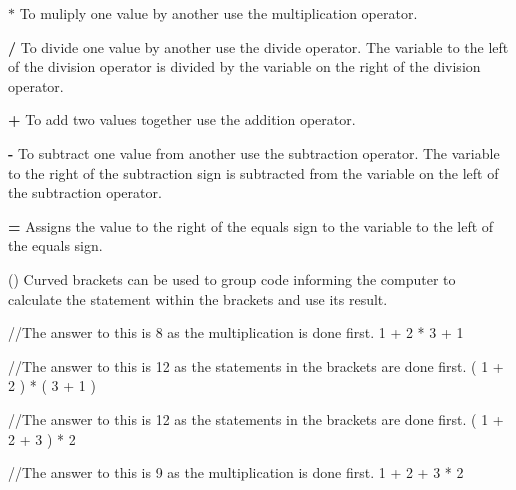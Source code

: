 \begin{DoxyItemize}
\item {\bfseries $\ast$} To muliply one value by another use the multiplication operator.
\item {\bfseries /} To divide one value by another use the divide operator. The variable to the left of the division operator is divided by the variable on the right of the division operator.
\item {\bfseries +} To add two values together use the addition operator.
\item {\bfseries -\/} To subtract one value from another use the subtraction operator. The variable to the right of the subtraction sign is subtracted from the variable on the left of the subtraction operator.
\item {\bfseries =} Assigns the value to the right of the equals sign to the variable to the left of the equals sign.
\item {\bfseries }() Curved brackets can be used to group code informing the computer to calculate the statement within the brackets and use its result.
\end{DoxyItemize}


\begin{DoxyCode}
 //The answer to this is 8 as the multiplication is done first.
 1 + 2 * 3 + 1

 //The answer to this is 12 as the statements in the brackets are done first.
 ( 1 + 2 ) * ( 3 + 1 )

 //The answer to this is 12 as the statements in the brackets are done first.
 ( 1 + 2 + 3 ) * 2

 //The answer to this is 9 as the multiplication is done first.
 1 + 2 + 3 * 2
\end{DoxyCode}

